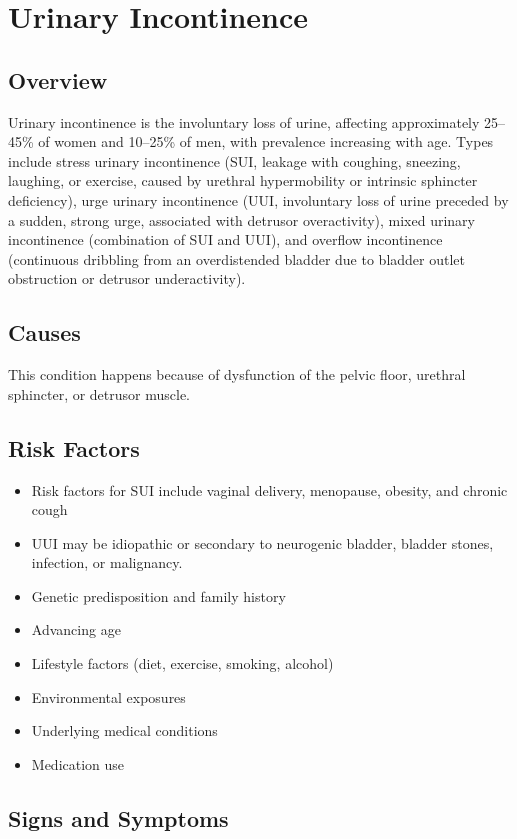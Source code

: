 \chapter{Urinary Incontinence}
\label{sec:Urinary Incontinence}

\section{Overview}
Urinary incontinence is the involuntary loss of urine, affecting approximately 25--45\% of women and 10--25\% of men, with prevalence increasing with age. Types include stress urinary incontinence (SUI, leakage with coughing, sneezing, laughing, or exercise, caused by urethral hypermobility or intrinsic sphincter deficiency), urge urinary incontinence (UUI, involuntary loss of urine preceded by a sudden, strong urge, associated with detrusor overactivity), mixed urinary incontinence (combination of SUI and UUI), and overflow incontinence (continuous dribbling from an overdistended bladder due to bladder outlet obstruction or detrusor underactivity).
\section{Causes}
This condition happens because of dysfunction of the pelvic floor, urethral sphincter, or detrusor muscle.     
\section{Risk Factors}
\begin{itemize}[noitemsep]
  \item Risk factors for SUI include vaginal delivery, menopause, obesity, and chronic cough
  \item UUI may be idiopathic or secondary to neurogenic bladder, bladder stones, infection, or malignancy.
  \item Genetic predisposition and family history
  \item Advancing age
  \item Lifestyle factors (diet, exercise, smoking, alcohol)
  \item Environmental exposures
  \item Underlying medical conditions
  \item Medication use
\end{itemize}
\section{Signs and Symptoms}
